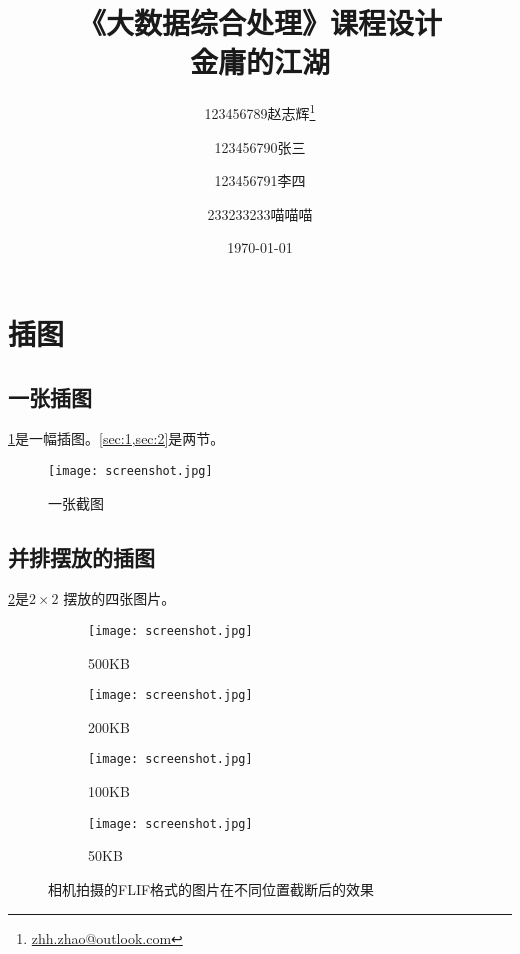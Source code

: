 \documentclass{dreamClass}
\title{
    \vspace{-50pt}
    \textbf{\Huge《大数据综合处理》课程设计}\\
    \textbf{\huge 金庸的江湖}
}
\author[1]{123456789赵志辉\thanks{\href{mailto:zhh.zhao@outlook.com}{zhh.zhao@outlook.com}}}
\author[1]{123456790张三}
\author[1]{123456791李四}
\author[2]{233233233喵喵喵}
\affil[1]{计算机科学与技术系，九乡河文理学院}
\affil[2]{喵喵喵，B612星球}
\date{\today}
\begin{document}
\maketitle
\thispagestyle{empty}

\section{插图}\label{sec:1}
\subsection{一张插图}\label{sec:2}
\cref{pic:desktop}是一幅插图。\cref{sec:1,sec:2}是两节。
\begin{figure}[H]
    \centering
    \texttt{[image: screenshot.jpg]}
    \caption{一张截图}\label{pic:desktop}
\end{figure}
\subsection{并排摆放的插图}
\cref{pic:flag}是\(2 \times 2\) 摆放的四张图片。
\begin{figure}
    \centering
    \begin{subfigure}{.5\textwidth}
        \centering
        \texttt{[image: screenshot.jpg]}
        \caption{500KB}
    \end{subfigure}%
    \begin{subfigure}{.5\textwidth}
        \centering
        \texttt{[image: screenshot.jpg]}
        \caption{200KB}
    \end{subfigure}

    \begin{subfigure}{.5\textwidth}
        \centering
        \texttt{[image: screenshot.jpg]}
        \caption{100KB}
    \end{subfigure}%
    \begin{subfigure}{.5\textwidth}
        \centering
        \texttt{[image: screenshot.jpg]}
        \caption{50KB}
    \end{subfigure}
    \caption{相机拍摄的FLIF格式的图片在不同位置截断后的效果\label{pic:flag}}
\end{figure}
\end{document}

